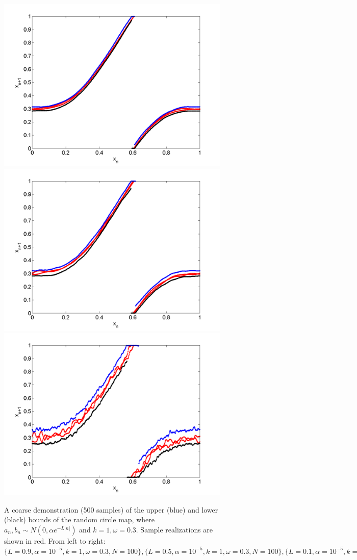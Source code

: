 \begin{figure}[htp]
\caption[Upper and lower bounds on the random circle map, with a normal
distribution, where $k=1,\omega=0.3$]{A coarse
  demonstration (500 samples) of the upper (blue) and lower (black)
  bounds of the random circle map, where $a_n,b_n\sim N(0,\alpha e^{-L|n|})$
  and $k=1,\omega=0.3$. Sample realizations are shown in red. From left to right:
  $\{L=0.9,\alpha = 10^{-5},k=1,\omega=0.3,N=100\}, \{L=0.5,\alpha = 10^{-5},k=1,\omega=0.3,N=100\},\{L=0.1,\alpha = 10^{-5},k=1,\omega=0.3,N=100\},$
  }\label{fig:circ_n_envelope1}
\centering
\includegraphics[width=.3\textwidth]{figs/envelope_norm_500_k1_L09_w03.png}\hfill
\includegraphics[width=.3\textwidth]{figs/envelope_norm_500_k1_L05_w03.png}\hfill
\includegraphics[width=.3\textwidth]{figs/envelope_norm_500_k1_L01_w03.png}
\end{figure}
